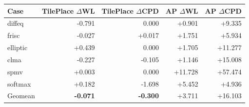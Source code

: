 \begin{tabular}{lrrrr}
\toprule
Case & TilePlace $\Delta$WL & TilePlace $\Delta$CPD & AP $\Delta$WL & AP $\Delta$CPD \\
\midrule
diffeq & -0.791 & 0.000 & +0.901 & +9.335 \\
frisc & -0.027 & +0.017 & +1.751 & +5.934 \\
elliptic & +0.439 & 0.000 & +1.705 & +11.277 \\
clma & -0.227 & -0.105 & +1.146 & +15.008 \\
spmv & +0.003 & 0.000 & +11.728 & +57.474 \\
softmax & +0.182 & -1.698 & +5.452 & +4.936 \\
\midrule
Geomean & \textbf{-0.071} & \textbf{-0.300} & +3.711 & +16.103 \\
\bottomrule
\end{tabular}
